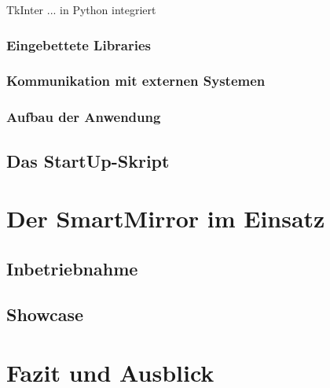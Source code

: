 TkInter ... in Python integriert



\subsubsection*{Eingebettete Libraries}

\subsubsection*{Kommunikation mit externen Systemen}
\label{subsec:kommunikation}
\subsubsection*{Aufbau der Anwendung}


\subsection{Das StartUp-Skript}

\section{Der SmartMirror im Einsatz}
\subsection{Inbetriebnahme}
\subsection{Showcase}

\section{Fazit und Ausblick}
